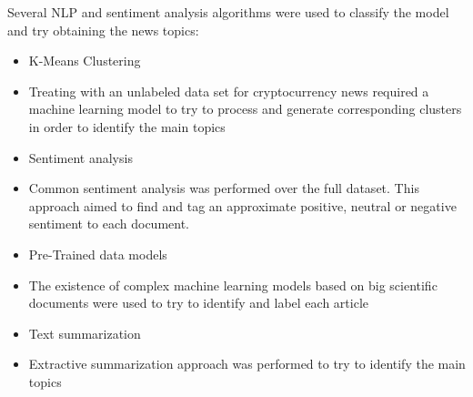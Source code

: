 Several NLP and sentiment analysis algorithms were used to classify the model and try obtaining the news topics:

\begin{itemize}
    \item K-Means Clustering
    \item Treating with an unlabeled data set for cryptocurrency news required a machine learning model to try to process and generate corresponding clusters in order to identify the main topics
    \item Sentiment analysis
    \item Common sentiment analysis was performed over the full dataset. This approach aimed to find and tag an approximate positive, neutral or negative sentiment to each document.
    \item Pre-Trained data models
    \item The existence of complex machine learning models based on big scientific documents were used to try to identify and label each article
    \item Text summarization
    \item Extractive summarization approach was performed to try to identify the main topics

\end{itemize}

